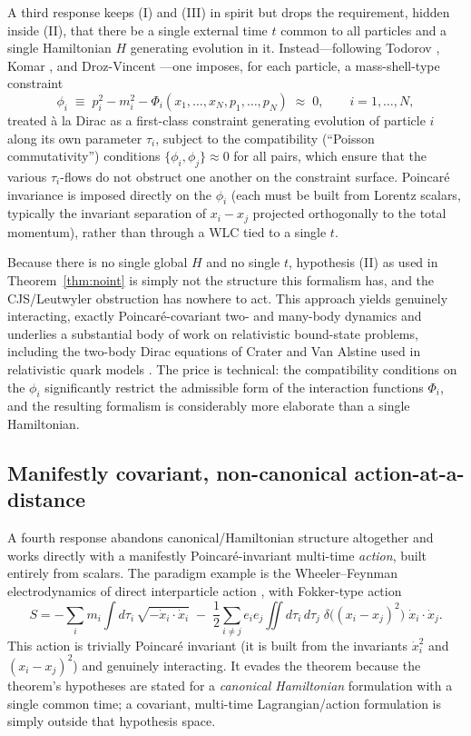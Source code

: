 \documentclass[11pt]{article}
\newcommand{\pb}[2]{\{#1,#2\}}
\begin{document}
A third response keeps (I) and (III) in spirit but drops the requirement, hidden inside (II), that there be a single external time $t$ common to all particles and a single Hamiltonian $H$ generating evolution in it. Instead---following Todorov \cite{Todorov1971,Todorov1978}, Komar \cite{Komar1978}, and Droz-Vincent \cite{DrozVincent1970,DrozVincent1975}---one imposes, for each particle, a mass-shell-type constraint
\begin{equation}
\phi_i \;\equiv\; p_i^2 - m_i^2 - \Phi_i(x_1,\dots,x_N,p_1,\dots,p_N) \;\approx\; 0, \qquad i=1,\dots,N,
\label{eq:constraint}
\end{equation}
treated \`a la Dirac as a first-class constraint generating evolution of particle $i$ along its own parameter $\tau_i$, subject to the compatibility (``Poisson commutativity'') conditions $\pb{\phi_i}{\phi_j}\approx 0$ for all pairs, which ensure that the various $\tau_i$-flows do not obstruct one another on the constraint surface. Poincar\'e invariance is imposed directly on the $\phi_i$ (each must be built from Lorentz scalars, typically the invariant separation of $x_i-x_j$ projected orthogonally to the total momentum), rather than through a WLC tied to a single $t$.

Because there is no single global $H$ and no single $t$, hypothesis (II) as used in Theorem~\ref{thm:noint} is simply not the structure this formalism has, and the CJS/Leutwyler obstruction has nowhere to act. This approach yields genuinely interacting, exactly Poincar\'e-covariant two- and many-body dynamics and underlies a substantial body of work on relativistic bound-state problems, including the two-body Dirac equations of Crater and Van Alstine used in relativistic quark models \cite{CraterVanAlstine}. The price is technical: the compatibility conditions on the $\phi_i$ significantly restrict the admissible form of the interaction functions $\Phi_i$, and the resulting formalism is considerably more elaborate than a single Hamiltonian.

\subsection{Manifestly covariant, non-canonical action-at-a-distance}
\label{sec:fokker}

A fourth response abandons canonical/Hamiltonian structure altogether and works directly with a manifestly Poincar\'e-invariant multi-time \emph{action}, built entirely from scalars. The paradigm example is the Wheeler--Feynman electrodynamics of direct interparticle action \cite{WheelerFeynman1945,WheelerFeynman1949}, with Fokker-type action
\begin{equation}
S = -\sum_i m_i\int d\tau_i\,\sqrt{-\dot x_i\cdot\dot x_i}\; -\;\frac12\sum_{i\ne j} e_ie_j \iint d\tau_i\,d\tau_j\;\delta\big((x_i-x_j)^2\big)\;\dot x_i\cdot\dot x_j .
\end{equation}
This action is trivially Poincar\'e invariant (it is built from the invariants $\dot x_i^2$ and $(x_i-x_j)^2$) and genuinely interacting. It evades the theorem because the theorem's hypotheses are stated for a \emph{canonical Hamiltonian} formulation with a single common time; a covariant, multi-time Lagrangian/action formulation is simply outside that hypothesis space.
\end{document}
